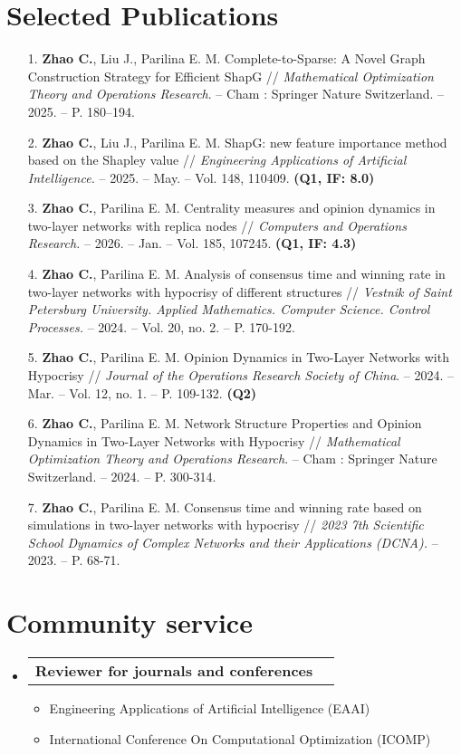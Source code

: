 \documentclass[letterpaper,10pt]{article}
\makeatletter
\newcommand{\resumeItem}[1]{
  \item\small{
    {#1 \vspace{-2pt}}
  }
}
\newcommand{\resumeProjectHeading}[2]{
  \item
  \begin{tabular*}{0.97\textwidth}{l@{\extracolsep{\fill}}r}
    \small#1 & #2 \\
  \end{tabular*}\vspace{-7pt}
}
\newenvironment{resumeSubHeadingList}{\begin{itemize}[leftmargin=0.15in, label={}]}{\end{itemize}}
\newenvironment{resumeItemList}{\begin{itemize}}{\end{itemize}}
\makeatother
\begin{document}
\section{Selected Publications}
\begin{enumerate}
  \fontsize{10}{10.5}\selectfont
  \item [1.] \textbf{Zhao C.}, Liu J., Parilina E. M. Complete-to-Sparse: A Novel Graph Construction Strategy for Efficient ShapG // {\it Mathematical Optimization Theory and Operations Research}. -- Cham : Springer Nature Switzerland. -- 2025. -- P. 180–194.
  \item [2.] \textbf{Zhao C.}, Liu J., Parilina E. M. ShapG: new feature importance method based on the Shapley value // {\it Engineering Applications of Artificial Intelligence.} -- 2025. -- May. -- Vol. 148, 110409. {\bf (Q1, IF: 8.0)}
  \item [3.] \textbf{Zhao C.}, Parilina E. M. Centrality measures and opinion dynamics in two-layer networks with replica nodes // {\it Computers and Operations Research.} -- 2026. -- Jan. -- Vol. 185, 107245. {\bf (Q1, IF: 4.3)}
  \item [4.] \textbf{Zhao C.}, Parilina E. M. Analysis of consensus time and winning rate in two-layer networks with hypocrisy of different structures // {\it Vestnik of Saint Petersburg University. Applied Mathematics. Computer Science. Control Processes.} -- 2024. -- Vol. 20, no. 2. -- P. 170-192.
  \item [5.] \textbf{Zhao C.}, Parilina E. M. Opinion Dynamics in Two-Layer Networks with Hypocrisy // {\it Journal of the Operations Research Society of China}. -- 2024. -- Mar. -- Vol. 12, no. 1. -- P. 109-132. {\bf (Q2)}
  \item [6.] \textbf{Zhao C.}, Parilina E. M. Network Structure Properties and Opinion Dynamics in Two-Layer Networks with Hypocrisy // {\it Mathematical Optimization Theory and Operations Research}. -- Cham : Springer Nature Switzerland. -- 2024. -- P. 300-314.
  \item [7.] \textbf{Zhao C.}, Parilina E. M. Consensus time and winning rate based on simulations in two-layer networks with hypocrisy // {\it 2023 7th Scientific School Dynamics of Complex Networks and their Applications (DCNA).} -- 2023. -- P. 68-71.
\end{enumerate}

\section{Community service}
\begin{resumeSubHeadingList}
  \resumeProjectHeading{{\bf Reviewer for journals and conferences}}{}
  \begin{resumeItemList}
    \resumeItem{Engineering Applications of Artificial Intelligence (EAAI)}
    \resumeItem{International Conference On Computational Optimization (ICOMP)}
  \end{resumeItemList}
\end{resumeSubHeadingList}
\end{document}
